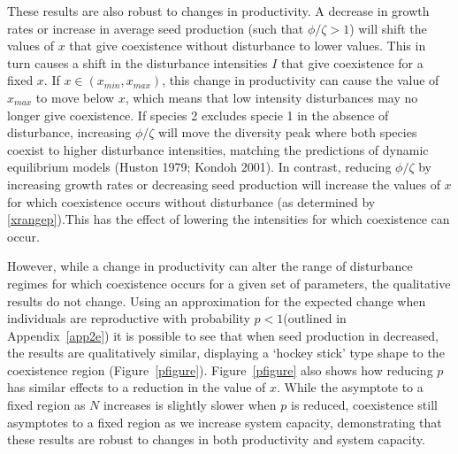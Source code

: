 These results are also robust to changes in productivity. A decrease in growth rates or increase in average seed production (such that $\phi/\zeta>1$) will shift the values of $x$ that give coexistence without disturbance to lower values. This in turn causes a shift in the disturbance intensities $I$ that give coexistence for a fixed $x$. If $x \in (x_{min},x_{max})$, this change in productivity can cause the value of $x_{max}$ to move below $x$, which means that low intensity disturbances may no longer  give coexistence. If species 2 excludes specie 1 in the absence of disturbance, increasing $\phi/ \zeta$ will move the diversity peak where both species coexist to higher disturbance intensities, matching the predictions of dynamic equilibrium models (Huston 1979; Kondoh 2001). In contrast, reducing $\phi/\zeta$ by increasing growth rates or decreasing seed production will increase the values of $x$ for which coexistence occurs without disturbance (as determined by \eqref{xrangep}).This has the effect of lowering the intensities for which coexistence can occur.

However, while a change in productivity can alter the range of disturbance regimes for which coexistence occurs for a given set of parameters, the qualitative results do not change. Using an approximation for the expected change when individuals are reproductive with probability $p<1$(outlined in Appendix~\ref{app2e}) it is possible to see that when seed production in decreased, the results are qualitatively similar, displaying a `hockey stick' type shape to the coexistence region (Figure~\ref{pfigure}). Figure~\ref{pfigure} also shows how reducing $p$ has similar effects to a reduction in the value of $x$. While the asymptote to a fixed region as $N$ increases is slightly slower when $p$ is reduced, coexistence still asymptotes to a fixed region as we increase system capacity, demonstrating that these results are robust to changes in both productivity and system capacity.

